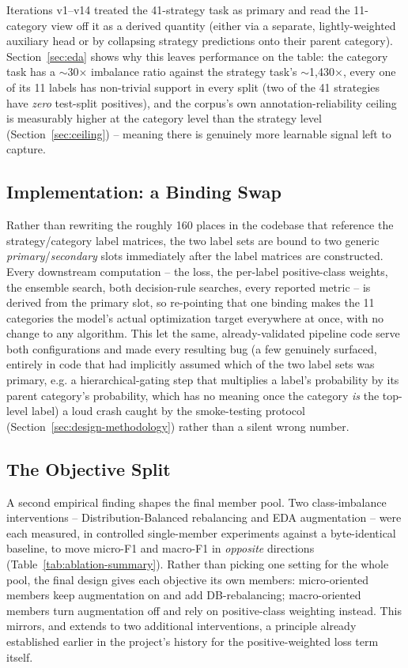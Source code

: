 Iterations v1--v14 treated the 41-strategy task as primary and read the
11-category view off it as a derived quantity (either via a separate,
lightly-weighted auxiliary head or by collapsing strategy predictions onto
their parent category). Section~\ref{sec:eda} shows why this leaves
performance on the table: the category task has a $\sim$30$\times$ imbalance
ratio against the strategy task's $\sim$1{,}430$\times$, every one of its 11
labels has non-trivial support in every split (two of the 41 strategies have
\emph{zero} test-split positives), and the corpus's own annotation-reliability
ceiling is measurably higher at the category level than the strategy level
(Section~\ref{sec:ceiling}) -- meaning there is genuinely more learnable
signal left to capture.

\subsection{Implementation: a Binding Swap}

Rather than rewriting the roughly 160 places in the codebase that reference
the strategy/category label matrices, the two label sets are bound to two
generic \emph{primary}/\emph{secondary} slots immediately after the label
matrices are constructed. Every downstream computation -- the loss, the
per-label positive-class weights, the ensemble search, both decision-rule
searches, every reported metric -- is derived from the primary slot, so
re-pointing that one binding makes the 11 categories the model's actual
optimization target everywhere at once, with no change to any algorithm.
This let the same, already-validated pipeline code serve both configurations
and made every resulting bug (a few genuinely surfaced, entirely in code
that had implicitly assumed which of the two label sets was primary, e.g. a
hierarchical-gating step that multiplies a label's probability by its parent
category's probability, which has no meaning once the category \emph{is} the
top-level label) a loud crash caught by the smoke-testing protocol
(Section~\ref{sec:design-methodology}) rather than a silent wrong number.

\subsection{The Objective Split}
\label{sec:objective-split}

A second empirical finding shapes the final member pool. Two class-imbalance
interventions -- Distribution-Balanced rebalancing and EDA augmentation --
were each measured, in controlled single-member experiments against a
byte-identical baseline, to move micro-F1 and macro-F1 in \emph{opposite}
directions (Table~\ref{tab:ablation-summary}). Rather than picking one
setting for the whole pool, the final design gives each objective its own
members: micro-oriented members keep augmentation on and add DB-rebalancing;
macro-oriented members turn augmentation off and rely on positive-class
weighting instead. This mirrors, and extends to two additional interventions,
a principle already established earlier in the project's history for the
positive-weighted loss term itself.


